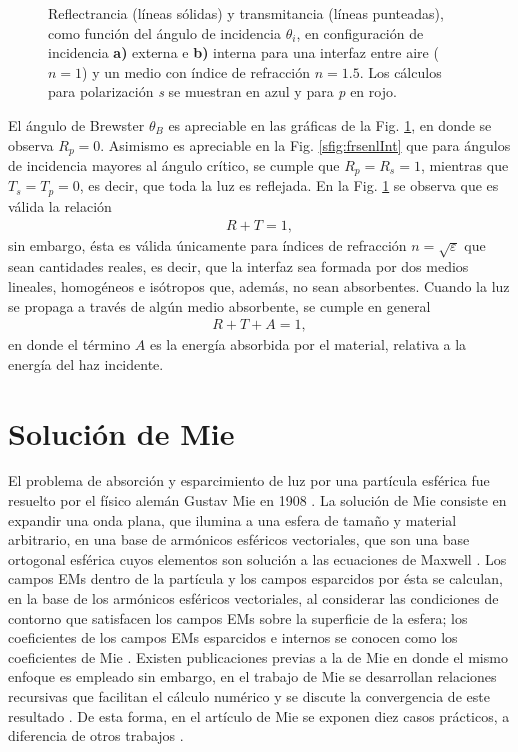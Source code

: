\begin{figure}[h!]
\begin{subfigure}{.43\textwidth}
	\end{subfigure}\vspace*{-.7em}
	\caption{  Reflectrancia (líneas sólidas) y transmitancia (líneas punteadas), como función del ángulo de incidencia $\theta_i$, en configuración de incidencia \textbf{a)} externa e \textbf{b)} interna para una interfaz entre  aire ($n=1$) y un medio con índice de refracción $n = 1.5$. Los cálculos para polarización  \emph{s} se muestran  en azul y  para \emph{p} en rojo.}	\label{fig:frsnel}	
	\end{figure}	
%

El ángulo de Brewster $\theta_B$ es apreciable en las gráficas de la Fig. \ref{fig:frsnel}, en donde se observa $R_p = 0$. Asimismo es apreciable en la Fig. \ref{sfig:frsenlInt} que para ángulos de incidencia mayores al ángulo crítico, se cumple que $R_p = R_s = 1$, mientras que $T_s = T_p = 0$, es decir, que toda la luz es reflejada. En la Fig. \ref{fig:frsnel} se observa que es válida la relación 
	\begin{align*}
	R + T = 1,
	\end{align*}
sin embargo, ésta es válida únicamente para índices de refracción $n = \sqrt{\varepsilon}$ que sean cantidades reales, es decir, que la interfaz sea formada por dos medios lineales, homogéneos e isótropos que, además, no sean absorbentes. Cuando la luz se propaga a través de algún medio absorbente, se cumple en general 
	\begin{align*}
	R + T + A = 1,
	\end{align*}
en donde el término $A$ es la energía absorbida por el material, relativa a la energía del haz incidente.

	
\section{Solución de Mie}

	
El problema de absorción y esparcimiento de luz por una partícula esférica fue resuelto por el físico alemán Gustav Mie en 1908 \cite{mie1908metallosung}.  La solución de Mie consiste en expandir una onda plana, que ilumina a una esfera de tamaño y material arbitrario, en una base de armónicos esféricos vectoriales, que son una base ortogonal esférica cuyos elementos son solución a las ecuaciones de Maxwell \cite{bohren1998absorption}.  Los campos EMs dentro de la partícula y los campos esparcidos por ésta se calculan, en la base de los armónicos esféricos vectoriales, al considerar las condiciones de contorno que satisfacen los campos EMs sobre la superficie de la esfera; los coeficientes de los campos EMs esparcidos e internos se conocen como los coeficientes de Mie \cite{bohren1998absorption}.  Existen publicaciones previas a la de Mie en donde el mismo enfoque es empleado \cite{horvath2009historic} sin embargo, en el trabajo de Mie se  desarrollan relaciones recursivas que facilitan el cálculo numérico y se discute la convergencia de este resultado \cite{horvath2009historic}.  De esta forma, en el artículo de Mie se exponen diez casos prácticos, a diferencia de otros trabajos \cite{horvath2009historic}. 

